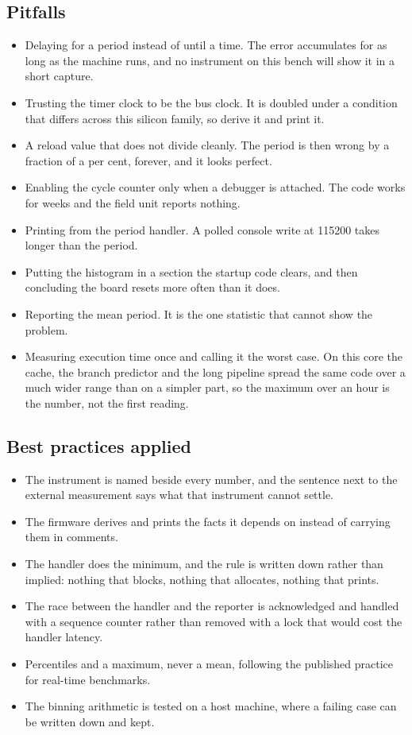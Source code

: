 \subsection*{Pitfalls}

\begin{itemize}
\item Delaying for a period instead of until a time. The error accumulates for
as long as the machine runs, and no instrument on this bench will show it in a
short capture.
\item Trusting the timer clock to be the bus clock. It is doubled under a
condition that differs across this silicon family, so derive it and print it.
\item A reload value that does not divide cleanly. The period is then wrong by a
fraction of a per cent, forever, and it looks perfect.
\item Enabling the cycle counter only when a debugger is attached. The code
works for weeks and the field unit reports nothing.
\item Printing from the period handler. A polled console write at 115200 takes
longer than the period.
\item Putting the histogram in a section the startup code clears, and then
concluding the board resets more often than it does.
\item Reporting the mean period. It is the one statistic that cannot show the
problem.
\item Measuring execution time once and calling it the worst case. On this core
the cache, the branch predictor and the long pipeline spread the same code over
a much wider range than on a simpler part, so the maximum over an hour is the
number, not the first reading.
\end{itemize}

\subsection*{Best practices applied}

\begin{itemize}
\item The instrument is named beside every number, and the sentence next to the
external measurement says what that instrument cannot settle.
\item The firmware derives and prints the facts it depends on instead of
carrying them in comments.
\item The handler does the minimum, and the rule is written down rather than
implied: nothing that blocks, nothing that allocates, nothing that prints.
\item The race between the handler and the reporter is acknowledged and handled
with a sequence counter rather than removed with a lock that would cost the
handler latency.
\item Percentiles and a maximum, never a mean, following the published practice
for real-time benchmarks.
\item The binning arithmetic is tested on a host machine, where a failing case
can be written down and kept.
\end{itemize}

